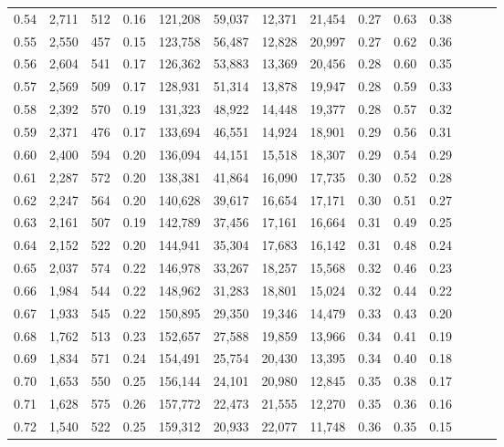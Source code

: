 \begin{tabular}{rrrrrrrrrrrrrr}
0.54 &  2,711 &  512 &  0.16 &  121,208 &   59,037 &  12,371 &  21,454 &  0.27 &  0.63 &      0.38 \\
0.55 &  2,550 &  457 &  0.15 &  123,758 &   56,487 &  12,828 &  20,997 &  0.27 &  0.62 &      0.36 \\
0.56 &  2,604 &  541 &  0.17 &  126,362 &   53,883 &  13,369 &  20,456 &  0.28 &  0.60 &      0.35 \\
0.57 &  2,569 &  509 &  0.17 &  128,931 &   51,314 &  13,878 &  19,947 &  0.28 &  0.59 &      0.33 \\
0.58 &  2,392 &  570 &  0.19 &  131,323 &   48,922 &  14,448 &  19,377 &  0.28 &  0.57 &      0.32 \\
0.59 &  2,371 &  476 &  0.17 &  133,694 &   46,551 &  14,924 &  18,901 &  0.29 &  0.56 &      0.31 \\
0.60 &  2,400 &  594 &  0.20 &  136,094 &   44,151 &  15,518 &  18,307 &  0.29 &  0.54 &      0.29 \\
0.61 &  2,287 &  572 &  0.20 &  138,381 &   41,864 &  16,090 &  17,735 &  0.30 &  0.52 &      0.28 \\
0.62 &  2,247 &  564 &  0.20 &  140,628 &   39,617 &  16,654 &  17,171 &  0.30 &  0.51 &      0.27 \\
0.63 &  2,161 &  507 &  0.19 &  142,789 &   37,456 &  17,161 &  16,664 &  0.31 &  0.49 &      0.25 \\
0.64 &  2,152 &  522 &  0.20 &  144,941 &   35,304 &  17,683 &  16,142 &  0.31 &  0.48 &      0.24 \\
0.65 &  2,037 &  574 &  0.22 &  146,978 &   33,267 &  18,257 &  15,568 &  0.32 &  0.46 &      0.23 \\
0.66 &  1,984 &  544 &  0.22 &  148,962 &   31,283 &  18,801 &  15,024 &  0.32 &  0.44 &      0.22 \\
0.67 &  1,933 &  545 &  0.22 &  150,895 &   29,350 &  19,346 &  14,479 &  0.33 &  0.43 &      0.20 \\
0.68 &  1,762 &  513 &  0.23 &  152,657 &   27,588 &  19,859 &  13,966 &  0.34 &  0.41 &      0.19 \\
0.69 &  1,834 &  571 &  0.24 &  154,491 &   25,754 &  20,430 &  13,395 &  0.34 &  0.40 &      0.18 \\
0.70 &  1,653 &  550 &  0.25 &  156,144 &   24,101 &  20,980 &  12,845 &  0.35 &  0.38 &      0.17 \\
0.71 &  1,628 &  575 &  0.26 &  157,772 &   22,473 &  21,555 &  12,270 &  0.35 &  0.36 &      0.16 \\
0.72 &  1,540 &  522 &  0.25 &  159,312 &   20,933 &  22,077 &  11,748 &  0.36 &  0.35 &      0.15 \\

\end{tabular}
